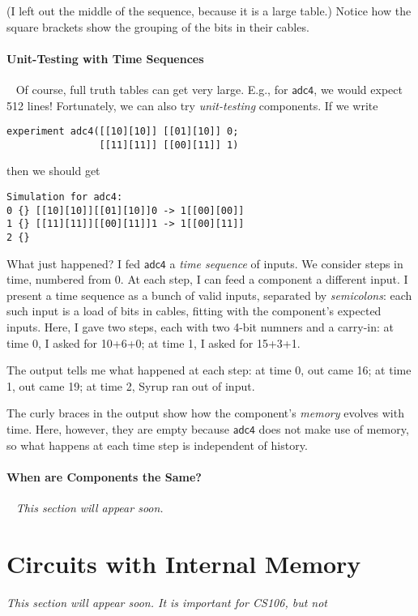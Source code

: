 \documentclass{article}
\newcommand{\C}{\mathsf}
\begin{document}
(I left out the middle of the sequence, because it is a large table.)
Notice how the square brackets show the grouping of the bits in their
cables.

\paragraph{Unit-Testing with Time Sequences}~
Of course, full truth tables can get very large. E.g., for $\C{adc4}$,
we would expect 512 lines! Fortunately, we can also try
\emph{unit-testing} components. If we write
\begin{verbatim}
experiment adc4([[10][10]] [[01][10]] 0;
                [[11][11]] [[00][11]] 1)
\end{verbatim}
then we should get
\begin{verbatim}
Simulation for adc4:
0 {} [[10][10]][[01][10]]0 -> 1[[00][00]]
1 {} [[11][11]][[00][11]]1 -> 1[[00][11]]
2 {}
\end{verbatim}

What just happened? I fed $\C{adc4}$ a \emph{time sequence} of inputs.
We consider steps in time, numbered from 0. At each step, I can feed
a component a different input.  I present a time
sequence as a bunch of valid inputs, separated by \emph{semicolons}:
each such input is a load of bits in cables, fitting with the
component's expected inputs. Here, I gave two steps, each with two
4-bit numners and a carry-in: at time 0, I
asked for 10+6+0; at time 1, I asked for 15+3+1.

The output tells me what happened at each step: at time 0, out came
16; at time 1, out came 19; at time 2, Syrup ran out of input.

The curly braces in the output show how the component's \emph{memory}
evolves with time. Here, however, they are empty because $\C{adc4}$
does not make use of memory, so what happens at each time step is
independent of history.


\paragraph{When are Components the Same?}~
\emph{This section will appear soon.}


\section{Circuits with Internal Memory}

\emph{This section will appear soon. It is important for CS106, but
  not }
\end{document}
